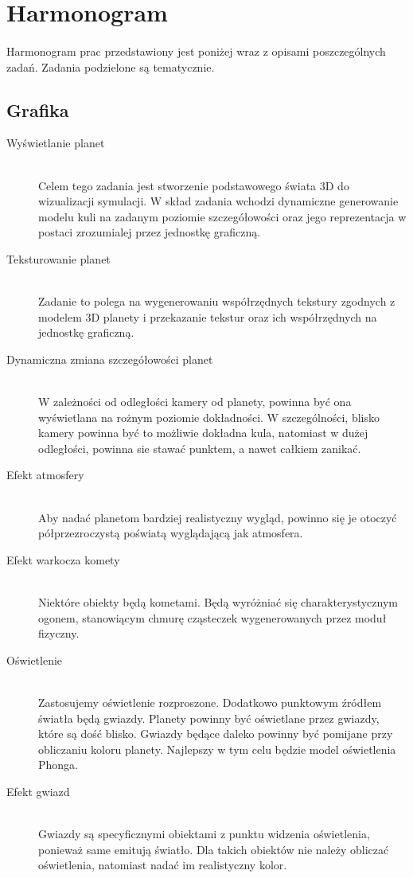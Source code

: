 \section{Harmonogram}\label{sec:harmonogram}

\paragraph{}

Harmonogram prac przedstawiony jest poniżej wraz z opisami poszczególnych zadań. Zadania podzielone są tematycznie.

\subsection{Grafika}

\begin{description}
	\item[Wyświetlanie planet] \hfill \\
	Celem tego zadania jest stworzenie podstawowego świata 3D do wizualizacji symulacji. W skład zadania wchodzi dynamiczne generowanie modelu kuli na zadanym poziomie szczegółowości oraz jego reprezentacja w postaci zrozumialej przez jednostkę graficzną.
	\item[Teksturowanie planet] \hfill \\
	Zadanie to polega na wygenerowaniu współrzędnych tekstury zgodnych z modelem 3D planety i przekazanie tekstur oraz ich współrzędnych na jednostkę graficzną.
	\item[Dynamiczna zmiana szczegółowości planet] \hfill \\
	W zależności od odległości kamery od planety, powinna być ona wyświetlana na rożnym poziomie dokładności. W szczególności, blisko kamery powinna być to możliwie dokładna kula, natomiast w dużej odległości, powinna sie stawać punktem, a nawet całkiem zanikać.
	\item[Efekt atmosfery] \hfill \\
	Aby nadać planetom bardziej realistyczny wygląd, powinno się je otoczyć półprzezroczystą poświatą wyglądającą jak atmosfera.
	\item[Efekt warkocza komety] \hfill \\
	Niektóre obiekty będą kometami. Będą wyróżniać się charakterystycznym ogonem, stanowiącym chmurę cząsteczek wygenerowanych przez moduł fizyczny.
	\item[Oświetlenie] \hfill \\
	Zastosujemy oświetlenie rozproszone. Dodatkowo punktowym źródłem światła będą gwiazdy. Planety powinny być oświetlane przez gwiazdy, które są dość blisko. Gwiazdy będące daleko powinny być pomijane przy obliczaniu koloru planety. Najlepszy w tym celu będzie model oświetlenia Phonga.
	\item[Efekt gwiazd] \hfill \\
	Gwiazdy są specyficznymi obiektami z punktu widzenia oświetlenia, ponieważ same emitują światło. Dla takich obiektów nie należy obliczać oświetlenia, natomiast nadać im realistyczny kolor.
\end{description}

